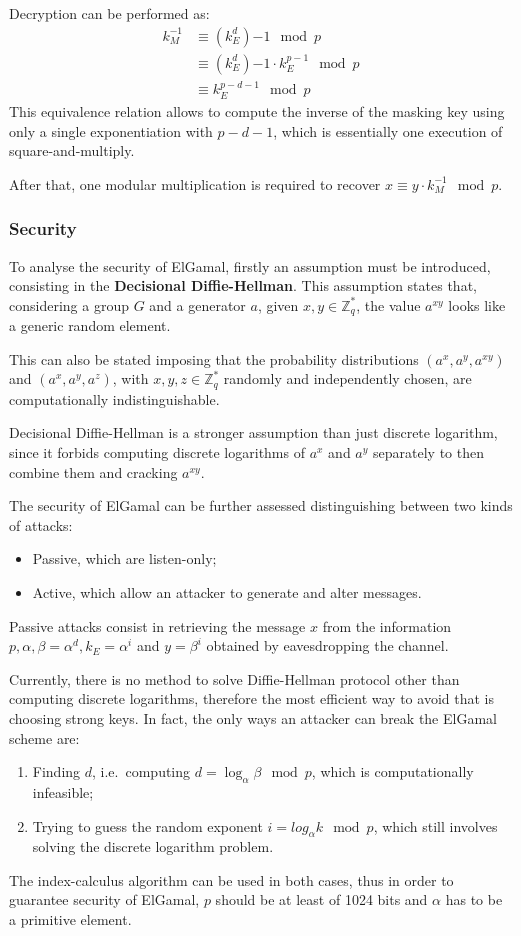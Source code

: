 Decryption can be performed as:
\begin{equation}
\begin{split}
k_M^{-1} &\equiv (k_E^d){-1} \mod p \\
&\equiv (k_E^d){-1}\cdot k_E^{p-1} \mod p \\
&\equiv k_E^{p-d-1} \mod p
\end{split}
\end{equation}
This equivalence relation allows to compute the inverse of the masking key using only a single exponentiation with $p - d - 1$, which is essentially one execution of square-and-multiply.

After that, one modular multiplication is required to recover $x \equiv y \cdot k_M^{-1} \mod p$. 

\subsubsection{Security}
To analyse the security of ElGamal, firstly an assumption must be introduced, consisting in the \textbf{Decisional Diffie-Hellman}. This assumption states that, considering a group $G$ and a generator $a$, given $x, y \in \mathbb{Z}^*_q$, the value $a^{xy}$ looks like a generic random element.

This can also be stated imposing that the probability distributions $(a^x, a^y, a^{xy})$ and $(a^x, a^y, a^z)$, with $x, y, z \in \mathbb{Z}^*_q$ randomly and independently chosen, are computationally indistinguishable. 

Decisional Diffie-Hellman is a stronger assumption than just discrete logarithm, since it forbids computing discrete logarithms of $a^x$ and $a^y$ separately to then combine them and cracking $a^{xy}$. 

The security of ElGamal can be further assessed distinguishing between two kinds of attacks:
\begin{itemize}
	\item Passive, which are listen-only;
	\item Active, which allow an attacker to generate and alter messages.
\end{itemize}

Passive attacks consist in retrieving the message $x$ from the information $p, \alpha, \beta = \alpha^d, k_E = \alpha^i$ and $y = \beta^i$ obtained by eavesdropping the channel. 

Currently, there is no method to solve Diffie-Hellman protocol other than computing discrete logarithms, therefore the most efficient way to avoid that is choosing strong keys. In fact, the only ways an attacker can break the ElGamal scheme are:
\begin{enumerate}
	\item Finding $d$, i.e.\ computing $d = \log_\alpha \beta \mod p$, which is computationally infeasible;
	\item Trying to guess the random exponent $i = log_\alpha k \mod p$, which still involves solving the discrete logarithm problem.
\end{enumerate}
The index-calculus algorithm can be used in both cases, thus in order to guarantee security of ElGamal, $p$ should be at least of 1024 bits and $\alpha$ has to be a primitive element. 

